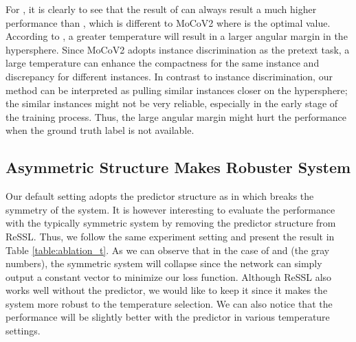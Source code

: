 \documentclass{article}
\newcommand{\<}{\left\langle}
\renewcommand{\>}{\right\rangle}
\begin{document}
For , it is clearly to see that the result of  can always result a much higher performance than , which is different to MoCoV2 where  is the optimal value. According to \cite{NormFace, CosFace, ArcFace}, a greater temperature will result in a larger angular margin in the hypersphere. Since MoCoV2 adopts instance discrimination as the pretext task, a large temperature can enhance the compactness for the same instance and discrepancy for different instances. In contrast to instance discrimination, our method can be interpreted as pulling similar instances closer on the hypersphere; the similar instances might not be very reliable, especially in the early stage of the training process. Thus, the large angular margin might hurt the performance when the ground truth label is not available. 

\subsection{Asymmetric Structure Makes Robuster System} 
Our default setting adopts the predictor structure as in \cite{byol, SimSiam} which breaks the symmetry of the system. It is however interesting to evaluate the performance with the typically symmetric system by removing the predictor structure from ReSSL. Thus, we follow the same experiment setting and present the result in Table \ref{table:ablation_t}. As we can observe that in the case of  and  (the gray numbers), the symmetric system will collapse since the network can simply output a constant vector to minimize our loss function. Although ReSSL also works well without the predictor, we would like to keep it since it makes the system more robust to the temperature selection. We can also notice that the performance will be slightly better with the predictor in various temperature settings.
\end{document}

